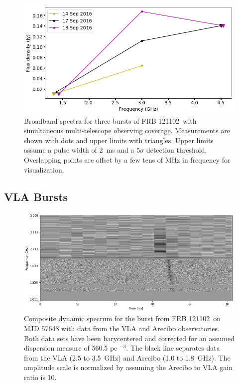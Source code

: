 \documentclass[twocolumn]{aastex61}
\newcommand{\frb}{FRB 121102}
\begin{document}
\begin{figure}[htb]
\begin{center}
 \includegraphics[width=\columnwidth]{multispec.png}
 \caption{Broadband spectra for three bursts of \frb\ with simultaneous multi-telescope observing coverage. Measurements are shown with dots and upper limits with triangles. Upper limits assume a pulse width of 2~ms and a $5\sigma$ detection threshold. Overlapping points are offset by a few tens of MHz in frequency for visualization.
 \label{fig:multi}}
\end{center}
\end{figure}

\subsection{VLA Bursts}

\begin{figure}[htb]
\begin{center}
 \includegraphics[width=1.9\columnwidth]{aovla_spec.png}
 \caption{Composite dynamic specrum for the burst from \frb\ on MJD 57648 with data from the VLA and Arecibo observatories. Both data sets have been barycentered and corrected for an assumed dispersion measure of 560.5 pc $^{-3}$. The black line separates data from the VLA (2.5 to 3.5~GHz) and Arecibo (1.0 to 1.8~GHz). The amplitude scale is normalized by assuming the Arecibo to VLA gain ratio is 10.
 \label{fig:sgram}}
\end{center}
\end{figure}
\end{document}

